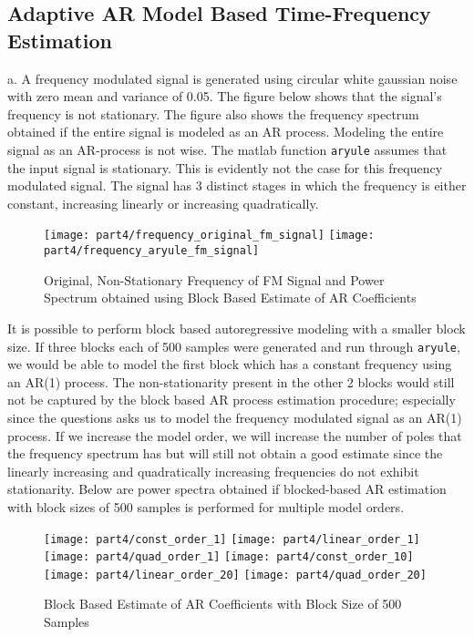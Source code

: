 \subsection{Adaptive AR Model Based Time-Frequency Estimation}

\noindent{}a. A frequency modulated signal is generated using circular white gaussian noise with zero mean and variance of 0.05. The figure below shows that the signal's frequency is not stationary. The figure also shows the frequency spectrum obtained if the entire signal is modeled as an AR process. Modeling the entire signal as an AR-process is not wise. The matlab function \texttt{aryule} assumes that the input signal is stationary. This is evidently not the case for this frequency modulated signal. The signal has 3 distinct stages in which the frequency is either constant, increasing linearly or increasing quadratically. 

\begin{figure}[H]
\centering{}
\texttt{[image: part4/frequency\_original\_fm\_signal]}
\texttt{[image: part4/frequency\_aryule\_fm\_signal]}
\caption{Original, Non-Stationary Frequency of FM Signal and Power Spectrum obtained using Block Based Estimate of AR Coefficients}
\end{figure}

\noindent{}It is possible to perform block based autoregressive modeling with a smaller block size. If three blocks each of 500 samples were generated and run through \texttt{aryule}, we would be able to model the first block which has a constant frequency using an AR(1) process. The non-stationarity present in the other 2 blocks would still not be captured by the block based AR process estimation procedure; especially since the questions asks us to model the frequency modulated signal as an AR(1) process. If we increase the model order, we will increase the number of poles that the frequency spectrum has but will still not obtain a good estimate since the linearly increasing and quadratically increasing frequencies do not exhibit stationarity. Below are power spectra obtained if blocked-based AR estimation with block sizes of 500 samples is performed for multiple model orders. 


\begin{figure}[H]
\centering{}
\texttt{[image: part4/const\_order\_1]}
\texttt{[image: part4/linear\_order\_1]}
\texttt{[image: part4/quad\_order\_1]}
\texttt{[image: part4/const\_order\_10]}
\texttt{[image: part4/linear\_order\_20]}
\texttt{[image: part4/quad\_order\_20]}
\caption{Block Based Estimate of AR Coefficients with Block Size of 500 Samples}
\end{figure}

